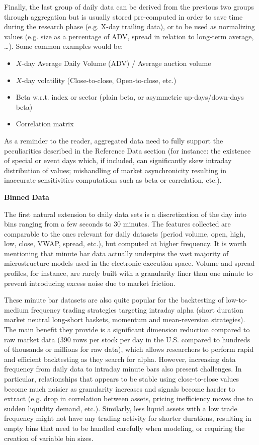Finally, the last group of daily data can be derived from the previous two groups through aggregation but is usually stored pre-computed in order to save time during the research phase (e.g. X-day trailing data), or to be used as normalizing values (e.g. size as a percentage of ADV, spread in relation to long-term average, \dots). Some common examples would be:
        \begin{itemize}
        \item $X$-day Average Daily Volume (ADV) / Average auction volume
        \item $X$-day volatility (Close-to-close, Open-to-close, etc.)
        \item Beta w.r.t. index or sector (plain beta, or asymmetric up-days/down-days beta)
        \item Correlation matrix
        \end{itemize}

As a reminder to the reader, aggregated data need to fully support the peculiarities described in the Reference Data section (for instance: the existence of special or event days which, if included, can significantly skew intraday distribution of values; mishandling of market asynchronicity resulting in inaccurate sensitivities computations such as beta or correlation, etc.).\twomedskip

\noindent\textbf{Binned Data}\twomedskip

The first natural extension to daily data sets is a discretization of the day into bins ranging from a few seconds to 30 minutes. The features collected are comparable to the ones relevant for daily datasets (period volume, open, high, low, close, VWAP, spread, etc.), but computed at higher frequency. It is worth mentioning that minute bar data actually underpins the vast majority of microstructure models used in the electronic execution space. Volume and spread profiles, for instance, are rarely built with a granularity finer than one minute to prevent introducing excess noise due to market friction.


These minute bar datasets are also quite popular for the backtesting of low-to-medium frequency trading strategies targeting intraday alpha (short duration market neutral long-short baskets, momentum and mean-reversion strategies). The main benefit they provide is a significant dimension reduction compared to raw market data (390 rows per stock per day in the U.S. compared to hundreds of thousands or millions for raw data), which allows researchers to perform rapid and efficient backtesting as they search for alpha. However, increasing data frequency from daily data to intraday minute bars also present challenges. In particular, relationships that appears to be stable using close-to-close values become much noisier as granularity increases and signals become harder to extract (e.g. drop in correlation between assets, pricing inefficiency moves due to sudden liquidity demand, etc.). Similarly, less liquid assets with a low trade frequency might not have any trading activity for shorter durations, resulting in empty bins that need to be handled carefully when modeling, or requiring the creation of variable bin sizes.



